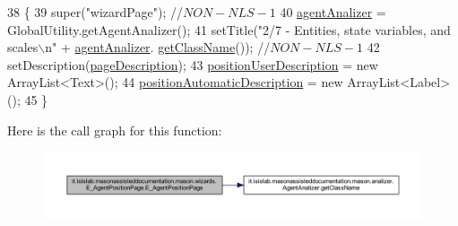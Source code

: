 \begin{DoxyCode}
38                                  \{
39         super(\textcolor{stringliteral}{"wizardPage"}); \textcolor{comment}{//$NON-NLS-1$}
40         \hyperlink{classit_1_1isislab_1_1masonassisteddocumentation_1_1mason_1_1wizards_1_1_e___agent_position_page_a2fe88598fc7248012ccf5298134f0196}{agentAnalizer} = GlobalUtility.getAgentAnalizer();
41         setTitle(\textcolor{stringliteral}{"2/7 - Entities, state variables, and scales\(\backslash\)n"} + \hyperlink{classit_1_1isislab_1_1masonassisteddocumentation_1_1mason_1_1wizards_1_1_e___agent_position_page_a2fe88598fc7248012ccf5298134f0196}{agentAnalizer}.
      \hyperlink{classit_1_1isislab_1_1masonassisteddocumentation_1_1mason_1_1analizer_1_1_agent_analizer_a94492199c5e4873a07a2a46d15617937}{getClassName}()); \textcolor{comment}{//$NON-NLS-1$}
42         setDescription(\hyperlink{classit_1_1isislab_1_1masonassisteddocumentation_1_1mason_1_1wizards_1_1_e___agent_position_page_a4737c08bab7788fba36663a11bf367fa}{pageDescription});
43         \hyperlink{classit_1_1isislab_1_1masonassisteddocumentation_1_1mason_1_1wizards_1_1_e___agent_position_page_a09e8462701fa4668917f97c2c2703a2c}{positionUserDescription} = \textcolor{keyword}{new} ArrayList<Text>();
44         \hyperlink{classit_1_1isislab_1_1masonassisteddocumentation_1_1mason_1_1wizards_1_1_e___agent_position_page_a3897e4e6c9669b071dccebca53188b08}{positionAutomaticDescription} = \textcolor{keyword}{new} ArrayList<Label>();
45     \}
\end{DoxyCode}


Here is the call graph for this function\-:\nopagebreak
\begin{figure}[H]
\begin{center}
\leavevmode
\includegraphics[width=350pt]{classit_1_1isislab_1_1masonassisteddocumentation_1_1mason_1_1wizards_1_1_e___agent_position_page_a760dd943747cb5b179c21dee2718b687_cgraph}
\end{center}
\end{figure}




